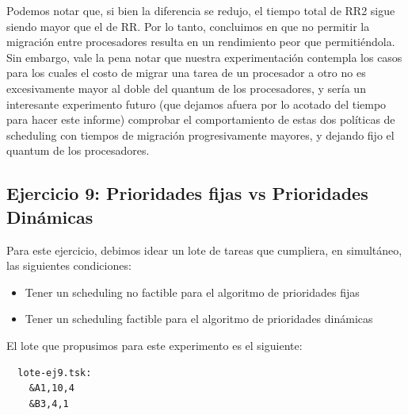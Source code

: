 Podemos notar que, si bien la diferencia se redujo, el tiempo total de RR2 sigue siendo mayor que el de RR. Por lo tanto, concluimos en que 
no permitir la migraci\'on entre procesadores resulta en un rendimiento peor que permiti\'endola. Sin embargo, vale la pena notar que nuestra 
experimentaci\'on contempla los casos para los cuales el costo de migrar una tarea de un procesador a otro no es excesivamente mayor al doble
del quantum de los procesadores, y ser\'ia un interesante experimento futuro (que dejamos afuera por lo acotado del tiempo para hacer este informe)
comprobar el comportamiento de estas dos pol\'iticas de scheduling con tiempos de migraci\'on progresivamente mayores, y dejando fijo el quantum
de los procesadores.

\subsection{Ejercicio 9: Prioridades fijas vs Prioridades Din\'amicas}

Para este ejercicio, debimos idear un lote de tareas que cumpliera, en simult\'aneo, las siguientes condiciones:

\begin{itemize}
 \item Tener un scheduling no factible para el algoritmo de prioridades fijas
 \item Tener un scheduling factible para el algoritmo de prioridades din\'amicas
\end{itemize}

El lote que propusimos para este experimento es el siguiente:

\begin{verbatim}
  lote-ej9.tsk:
    &A1,10,4
    &B3,4,1
\end{verbatim}

